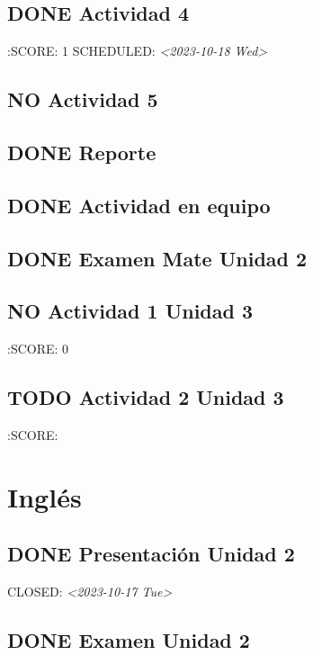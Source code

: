 \documentclass[11pt]{article}
\begin{document}
\subsection{{\bfseries\sffamily DONE} Actividad 4}
\label{sec:org5f65adf}
:SCORE: 1
SCHEDULED: \textit{<2023-10-18 Wed>}
\subsection{{\bfseries\sffamily NO} Actividad 5}
\label{sec:orgc0d29fc}
\subsection{{\bfseries\sffamily DONE} Reporte}
\label{sec:orgf570d63}
\subsection{{\bfseries\sffamily DONE} Actividad en equipo}
\label{sec:org856f051}
\subsection{{\bfseries\sffamily DONE} Examen Mate Unidad 2}
\label{sec:org473fe0b}
\subsection{{\bfseries\sffamily NO} Actividad 1 Unidad 3}
\label{sec:orgd0d81c2}
:SCORE: 0
\subsection{{\bfseries\sffamily TODO} Actividad 2 Unidad 3}
\label{sec:orgc9b8cae}
:SCORE:
\section{Inglés}
\label{sec:org897bba9}
\subsection{{\bfseries\sffamily DONE} Presentación Unidad 2}
\label{sec:orga8e90bd}
CLOSED: \textit{<2023-10-17 Tue>}
\subsection{{\bfseries\sffamily DONE} Examen Unidad 2}
\label{sec:org6df2052}
\end{document}
